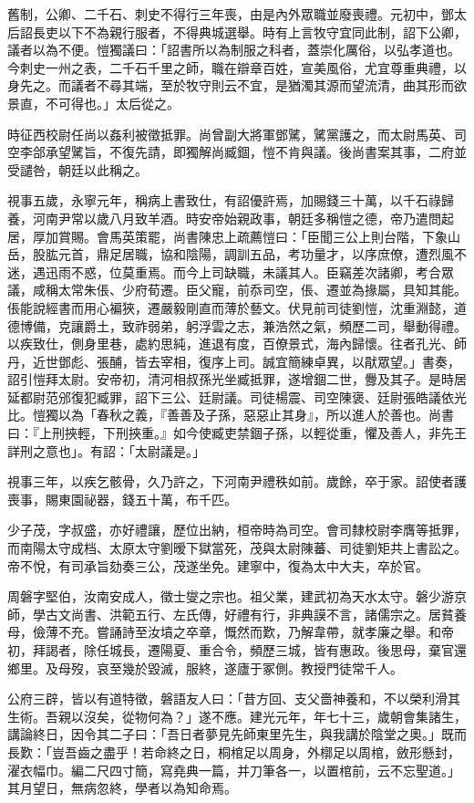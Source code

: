 \begin{pinyinscope}
舊制，公卿、二千石、刺史不得行三年喪，由是內外眾職並廢喪禮。元初中，鄧太后詔長吏以下不為親行服者，不得典城選舉。時有上言牧守宜同此制，詔下公卿，議者以為不便。愷獨議曰：「詔書所以為制服之科者，蓋崇化厲俗，以弘孝道也。今刺史一州之表，二千石千里之師，職在辯章百姓，宣美風俗，尤宜尊重典禮，以身先之。而議者不尋其端，至於牧守則云不宜，是猶濁其源而望流清，曲其形而欲景直，不可得也。」太后從之。

時征西校尉任尚以姦利被徵抵罪。尚曾副大將軍鄧騭，騭黨護之，而太尉馬英、司空李郃承望騭旨，不復先請，即獨解尚臧錮，愷不肯與議。後尚書案其事，二府並受譴咎，朝廷以此稱之。

視事五歲，永寧元年，稱病上書致仕，有詔優許焉，加賜錢三十萬，以千石祿歸養，河南尹常以歲八月致羊酒。時安帝始親政事，朝廷多稱愷之德，帝乃遣問起居，厚加賞賜。會馬英策罷，尚書陳忠上疏薦愷曰：「臣聞三公上則台階，下象山岳，股肱元首，鼎足居職，協和陰陽，調訓五品，考功量才，以序庶僚，遭烈風不迷，遇迅雨不惑，位莫重焉。而今上司缺職，未議其人。臣竊差次諸卿，考合眾議，咸稱太常朱倀、少府荀遷。臣父寵，前忝司空，倀、遷並為掾屬，具知其能。倀能說經書而用心褊狹，遷嚴毅剛直而薄於藝文。伏見前司徒劉愷，沈重淵懿，道德博備，克讓爵土，致祚弱弟，躬浮雲之志，兼浩然之氣，頻歷二司，舉動得禮。以疾致仕，側身里巷，處約思純，進退有度，百僚景式，海內歸懷。往者孔光、師丹，近世鄧彪、張酺，皆去宰相，復序上司。誠宜簡練卓異，以猒眾望。」書奏，詔引愷拜太尉。安帝初，清河相叔孫光坐臧抵罪，遂增錮二世，釁及其子。是時居延都尉范邠復犯臧罪，詔下三公、廷尉議。司徒楊震、司空陳褒、廷尉張皓議依光比。愷獨以為「春秋之義，『善善及子孫，惡惡止其身』，所以進人於善也。尚書曰：『上刑挾輕，下刑挾重。』如今使臧吏禁錮子孫，以輕從重，懼及善人，非先王詳刑之意也」。有詔：「太尉議是。」

視事三年，以疾乞骸骨，久乃許之，下河南尹禮秩如前。歲餘，卒于家。詔使者護喪事，賜東園祕器，錢五十萬，布千匹。

少子茂，字叔盛，亦好禮讓，歷位出納，桓帝時為司空。會司隸校尉李膺等抵罪，而南陽太守成档、太原太守劉暧下獄當死，茂與太尉陳蕃、司徒劉矩共上書訟之。帝不悅，有司承旨劾奏三公，茂遂坐免。建寧中，復為太中大夫，卒於官。

周磐字堅伯，汝南安成人，徵士燮之宗也。祖父業，建武初為天水太守。磐少游京師，學古文尚書、洪範五行、左氏傳，好禮有行，非典謨不言，諸儒宗之。居貧養母，儉薄不充。嘗誦詩至汝墳之卒章，慨然而歎，乃解韋帶，就孝廉之舉。和帝初，拜謁者，除任城長，遷陽夏、重合令，頻歷三城，皆有惠政。後思母，棄官還鄉里。及母歿，哀至幾於毀滅，服終，遂廬于冢側。教授門徒常千人。

公府三辟，皆以有道特徵，磐語友人曰：「昔方回、支父嗇神養和，不以榮利滑其生術。吾親以沒矣，從物何為？」遂不應。建光元年，年七十三，歲朝會集諸生，講論終日，因令其二子曰：「吾日者夢見先師東里先生，與我講於陰堂之奧。」既而長歎：「豈吾齒之盡乎！若命終之日，桐棺足以周身，外槨足以周棺，斂形懸封，濯衣幅巾。編二尺四寸簡，寫堯典一篇，并刀筆各一，以置棺前，云不忘聖道。」其月望日，無病忽終，學者以為知命焉。


\end{pinyinscope}
